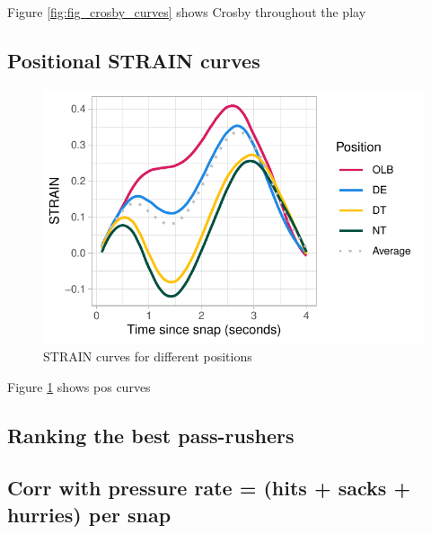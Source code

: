 \documentclass{statsoc}
\begin{document}
Figure \ref{fig:fig_crosby_curves} shows Crosby throughout the play

\hypertarget{positional-strain-curves}{%
\subsection{Positional STRAIN curves}\label{positional-strain-curves}}

\begin{figure}

{\centering \includegraphics{paper_files/figure-latex/fig_pos_curves-1} 

}

\caption{STRAIN curves for different positions}\label{fig:fig_pos_curves}
\end{figure}

Figure \ref{fig:fig_pos_curves} shows pos curves

\hypertarget{ranking-the-best-pass-rushers}{%
\subsection{Ranking the best
pass-rushers}\label{ranking-the-best-pass-rushers}}

\hypertarget{corr-with-pressure-rate-hits-sacks-hurries-per-snap}{%
\subsection{Corr with pressure rate = (hits + sacks + hurries) per
snap}\label{corr-with-pressure-rate-hits-sacks-hurries-per-snap}}
\end{document}
